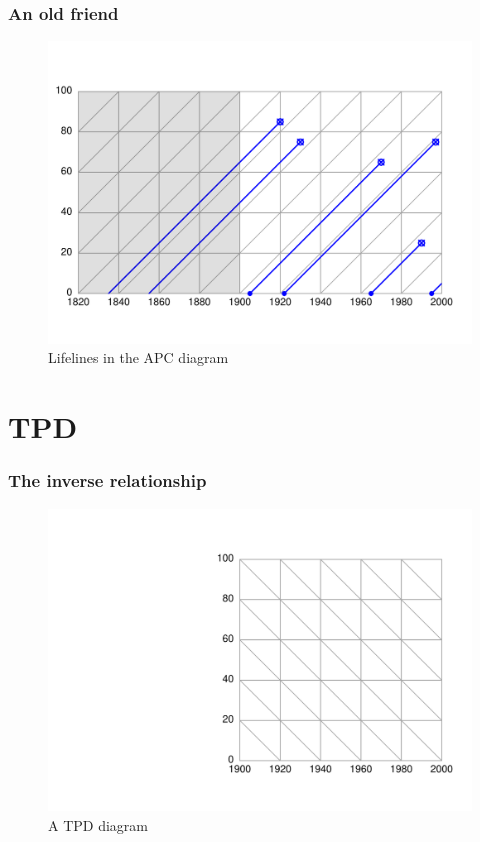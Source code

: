 \documentclass{beamer}
\begin{document}
\begin{frame}
\frametitle{An old friend}
\begin{figure}[b]
    \centering
    \includegraphics[scale=.7]{Figures/LabPres/APC2.pdf}
    \caption{Lifelines in the APC diagram}
\end{figure} 
\end{frame}

\section{TPD}
\begin{frame}
\frametitle{The inverse relationship}
\begin{figure}[b]
    \centering
    \includegraphics[scale=.7]{Figures/LabPres/TPD1.pdf}
    \caption{A TPD diagram}
\end{figure} 
\end{frame}
\end{document}
